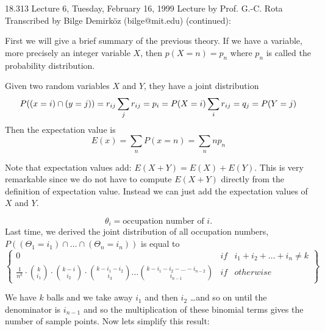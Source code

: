 {\Large 18.313 Lecture 6, Tuesday, February 16, 1999}\newline
{\large Lecture by Prof. G.-C. Rota}\newline
Transcribed by Bilge Demirk\"oz (bilge@mit.edu)\newline
\newline
{} (continued):

First we will give a brief summary of the previous theory. If we have
a variable, more precisely an integer variable $X$, then $p(X=n)= p_{n}$
where $p_{n}$ is called the probability distribution. 

Given two random variables $X$ and $Y$, they have a joint distribution
\begin{equation}
P((x=i) \cap (y=j)) = r_{ij}\\
\sum_{j} r_{ij} = p_{i} = P(X=i)\\ 
\sum_{i} r_{ij} = q_{j} = P(Y=j)
\end{equation}
Then the expectation value is 
\begin{equation}
E(x)= \sum_{n} P(x=n) = \sum_{n} n p_{n}
\end{equation}
 
Note that expectation values add:
$E(X+Y)=E(X)+E(Y)$. 
This is very remarkable since we do not have to compute $E(X+Y)$
directly from the definition of expectation value. Instead we can just
add the expectation values of $X$ and $Y$.

\begin{equation}
\theta_{i} = \mbox{occupation number of } i.
\end{equation}
Last time, we derived the joint distribution of all occupation
numbers, $P((\Theta_{1} = i_{1}) \cap \ldots \cap (\Theta_{n} =
i_{n}))$ is equal to
\begin{equation} 
\left\{ 
\begin {array}{rcl}
0 & if & i_{1}+ i_{2}+ \ldots+i_{n} \not = k\\
\frac{1}{n^{k}} \cdot {{k} \choose i_{1}} \cdot {{k-i} \choose {i_{2}}} \cdot {{k-i_{1}-i_{2}} \choose {i_{3}}} \ldots {{k-i_{1}-i_{2}-\ldots-i_{n-2}} \choose {i_{n-1}}} & if & otherwise
\end{array}
\right\}
\end{equation}

We have $k$ balls and we take away $i_{1}$ and then $i_{2}$ \ldots and so on until the denominator is $i_{n-1}$ and so the multiplication of these binomial terms gives the number of sample points. Now lets simplify this result:

